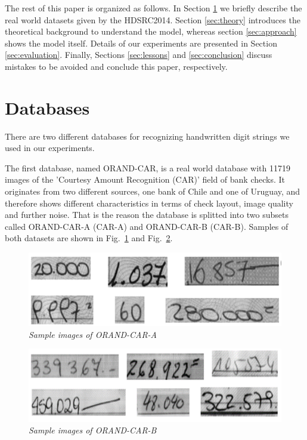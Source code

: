 The rest of this paper is organized as follows. In Section \ref{Datasets} we
briefly describe the real world datasets given by the HDSRC2014. Section
\ref{sec:theory} introduces the theoretical background to understand the model, whereas section \ref{sec:approach} shows the model itself. Details of our experiments are presented in Section \ref{sec:evaluation}.
Finally, Sections \ref{sec:lessons} and \ref{sec:conclusion} discuss mistakes
to be avoided and conclude this paper, respectively.

\section{Databases} \label{Datasets}
There are two different databases for recognizing handwritten digit strings we used in our experiments.

The first database, named ORAND-CAR, is a real world database with 11719 images
of the 'Courtesy Amount Recognition (CAR)' field of bank checks. It originates
from two different sources, one bank of Chile and one of Uruguay, and therefore
shows different characteristics in terms of check layout, image quality and
further noise. That is the reason the database is splitted into two subsets
called ORAND-CAR-A (CAR-A) and ORAND-CAR-B (CAR-B). Samples of both datasets are
shown in Fig.~\ref{fig:carA} and Fig.~\ref{fig:carB}.

\begin{figure}
  \includegraphics[width=\linewidth]{images/CAR-A-Splitted.png}
  \caption{\it Sample images of ORAND-CAR-A}
  \label{fig:carA}
\end{figure}

\begin{figure}
  \includegraphics[width=\linewidth]{images/CAR-B-Splitted.png}
  \caption{\it Sample images of ORAND-CAR-B}
  \label{fig:carB}
\end{figure}

